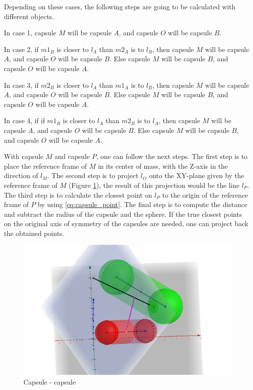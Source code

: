 \documentclass[a4paper, 10pt, conference]{ieeeconf}      %
\begin{document}
Depending on these cases, the following steps are going to be calculated with different objects.

In case 1, capsule $M$ will be capsule $A$, and capsule $O$ will be capsule $B$.

In case 2, if $m1_B$ is closer to $l_A$ than $m2_A$ is to $l_B$, then capsule $M$ will be capsule $A$, and capsule $O$ will be capsule $B$.
Else capsule $M$ will be capsule $B$, and capsule $O$ will be capsule $A$.

In case 3, if $m2_B$ is closer to $l_A$ than $m1_A$ is to $l_B$, then capsule $M$ will be capsule $A$, and capsule $O$ will be capsule $B$.
Else capsule $M$ will be capsule $B$, and capsule $O$ will be capsule $A$.

In case 4, if if $m1_B$ is closer to $l_A$ than $m2_B$ is to $l_A$, then capsule $M$ will be capsule $A$, and capsule $O$ will be capsule $B$.
Else capsule $M$ will be capsule $B$, and capsule $O$ will be capsule $A$.

With capsule $M$ and capsule $P$, one can follow the next steps.
The first step is to place the reference frame of $M$ in its center of mass, with the Z-axis in the direction of $l_M$. 
The second step is to project $l_O$ onto the XY-plane given by the reference frame of $M$ (Figure \ref{fig:capsule_capsule}),
the result of this projection would be the line $l_P$.
The third step is to calculate the closest point on $l_P$ to the origin of the reference frame of $P$ by using \eqref{eq:capsule_point}. 
The final step is to compute the distance and subtract the radius of the capsule and the sphere.
If the true closest points on the original axis of symmetry of the capsules are needed, one can project back the obtained points.

\begin{figure}[H]
    \centering
    \includegraphics[scale=0.15]{images/capsule-capsule.png}
    \caption{Capsule - capsule}
    \label{fig:capsule_capsule}
\end{figure}
\end{document}
